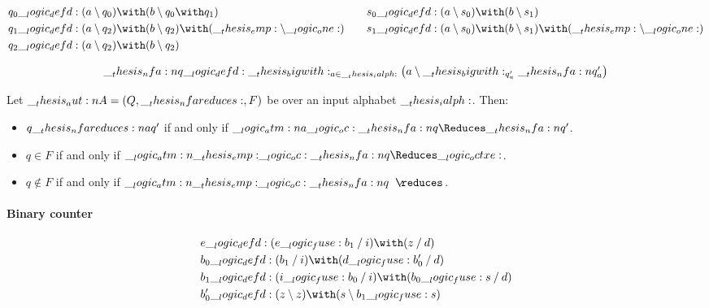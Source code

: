 \begin{equation*}
  \begin{lgathered}[t]
    q_0 \defd (a \limp q_0) \with (b \limp q_0 \with q_1) \\
    q_1 \defd (a \limp q_2) \with (b \limp q_2) \with (\emp \limp \one) \\
    q_2 \defd (a \limp q_2) \with (b \limp q_2)
  \end{lgathered}
  \qquad
  \begin{lgathered}[t]
    s_0 \defd (a \limp s_0) \with (b \limp s_1) \\
    s_1 \defd (a \limp s_0) \with (b \limp s_1) \with (\emp \limp \one)
  \end{lgathered}
\end{equation*}

\begin{equation*}
  \__thesis_nfa:n {q} \__logic_defd: \__thesis_bigwith:_{a \in \__thesis_ialph:} \bigl({\textstyle a \mathbin { \setminus } \__thesis_bigwith:_{q'_a} \__thesis_nfa:n {q}'_a}\bigr)
\end{equation*}

\begin{theorem}
  Let $\aut{A} = (Q, \mathord{\nfareduces}, F)$ be  over an input alphabet $\__thesis_ialph:$.
  Then:
  \begin{itemize}[nosep]
  \item $q \nfareduces[a] q'$ if and only if $\atm{a} \oc \nfa{q} \Reduces \nfa{q}'$.
  \item $q \in F$ if and only if $\atm{\emp} \oc \nfa{q} \Reduces \octxe$.
  \item $q \notin F$ if and only if $\atm{\emp} \oc \nfa{q} \longarrownot\reduces$.
  \end{itemize}
\end{theorem}


\paragraph*{Binary counter}

\begin{equation*}
  \begin{lgathered}
    e \defd (e \fuse b_1 \pmir i) \with (z \pmir d) \\
    b_0 \defd (b_1 \pmir i) \with (d \fuse b'_0 \pmir d) \\
    b_1 \defd (i \fuse b_0 \pmir i) \with (b_0 \fuse s \pmir d) \\
    b'_0 \defd (z \limp z) \with (s \limp b_1 \fuse s)
  \end{lgathered}
\end{equation*}

